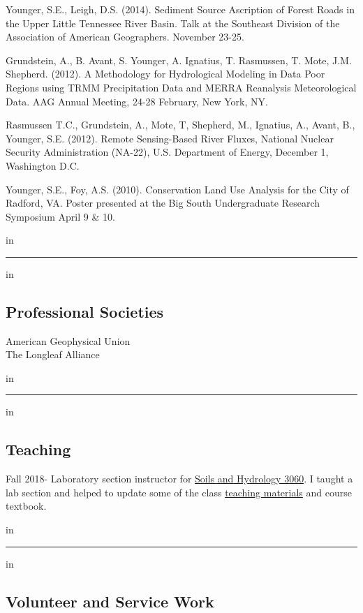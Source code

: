 \documentclass[10pt,letterpaper]{article}
\begin{document}
\begin{hangparas}{.25in}{1}
		Younger, S.E., Leigh, D.S. (2014). Sediment Source Ascription of Forest Roads in the Upper Little Tennessee River Basin. Talk at the Southeast Division of the Association of American Geographers. November 23-25.
		
		Grundstein, A., B. Avant, S. Younger, A. Ignatius, T. Rasmussen, T. Mote, J.M. Shepherd. (2012). A Methodology for Hydrological Modeling in Data Poor Regions using TRMM Precipitation Data and MERRA Reanalysis Meteorological Data. AAG Annual Meeting, 24-28 February, New York, NY.
		
		Rasmussen T.C., Grundstein, A., Mote, T, Shepherd, M., Ignatius, A., Avant, B., Younger, S.E. (2012). Remote Sensing-Based River Fluxes, National Nuclear Security Administration (NA-22), U.S. Department of Energy, December 1, Washington D.C.
		
		Younger, S.E., Foy, A.S. (2010). Conservation Land Use Analysis for the City of Radford, VA. Poster presented at the Big South Undergraduate Research Symposium April 9 \& 10.
		
	\end{hangparas}
	
	 in
	
	\hrule
	\vspace{-0.4em}
	 in
	\subsection*{Professional Societies}
	
	American Geophysical Union \\
	The Longleaf Alliance
	
	 in
	
	\hrule
	\vspace{-0.4em}
	 in
	\subsection*{Teaching}
	
	Fall 2018- Laboratory section instructor for \href{http://www.hydrology.uga.edu/rasmussen/class/3060/index.html}{Soils and Hydrology 3060}. I taught a lab section and helped to update some of the class \href{https://seyounger.github.io/soils_and_hydro_teaching/}{teaching materials} and course textbook.
	
	 in
	
	\hrule
	\vspace{-0.4em}
	 in
	\subsection*{Volunteer and Service Work}
	
\end{document}

